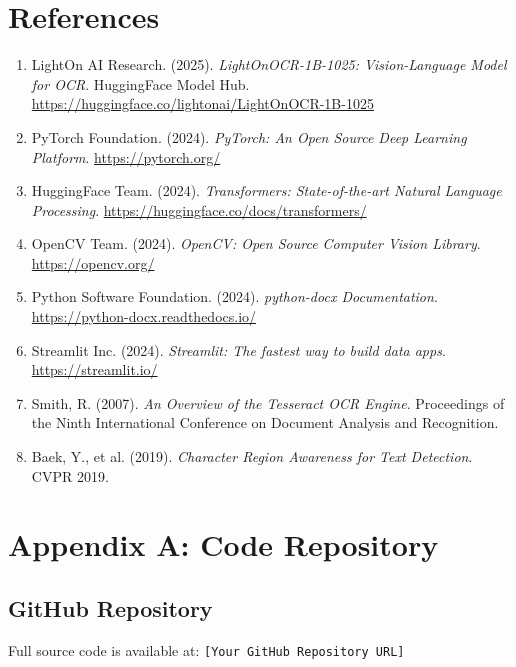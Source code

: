 \documentclass[12pt,a4paper]{article}
\begin{document}
\newpage

\section*{References}

\begin{enumerate}
    \item LightOn AI Research. (2025). \textit{LightOnOCR-1B-1025: Vision-Language Model for OCR}. HuggingFace Model Hub. \url{https://huggingface.co/lightonai/LightOnOCR-1B-1025}
    
    \item PyTorch Foundation. (2024). \textit{PyTorch: An Open Source Deep Learning Platform}. \url{https://pytorch.org/}
    
    \item HuggingFace Team. (2024). \textit{Transformers: State-of-the-art Natural Language Processing}. \url{https://huggingface.co/docs/transformers/}
    
    \item OpenCV Team. (2024). \textit{OpenCV: Open Source Computer Vision Library}. \url{https://opencv.org/}
    
    \item Python Software Foundation. (2024). \textit{python-docx Documentation}. \url{https://python-docx.readthedocs.io/}
    
    \item Streamlit Inc. (2024). \textit{Streamlit: The fastest way to build data apps}. \url{https://streamlit.io/}
    
    \item Smith, R. (2007). \textit{An Overview of the Tesseract OCR Engine}. Proceedings of the Ninth International Conference on Document Analysis and Recognition.
    
    \item Baek, Y., et al. (2019). \textit{Character Region Awareness for Text Detection}. CVPR 2019.
\end{enumerate}

\newpage

\section*{Appendix A: Code Repository}

\subsection*{GitHub Repository}
Full source code is available at: \texttt{[Your GitHub Repository URL]}
\end{document}
